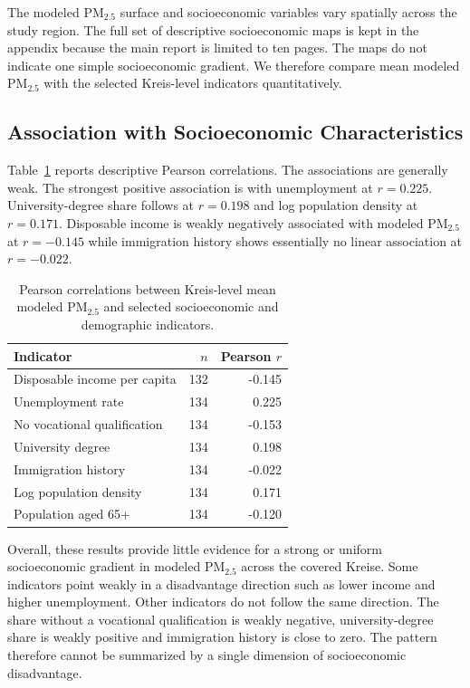 \documentclass[english, a4paper]{article}
\begin{document}
The modeled PM$_{2.5}$ surface and socioeconomic variables vary spatially across the study region. The full set of descriptive socioeconomic maps is kept in the appendix because the main report is limited to ten pages. The maps do not indicate one simple socioeconomic gradient. We therefore compare mean modeled PM$_{2.5}$ with the selected Kreis-level indicators quantitatively.


\subsection{Association with Socioeconomic Characteristics}
\label{sec:socio_assoc}

Table~\ref{tab:socio_correlations} reports descriptive Pearson correlations. The associations are generally weak. The strongest positive association is with unemployment at $r=0.225$. University-degree share follows at $r=0.198$ and log population density at $r=0.171$. Disposable income is weakly negatively associated with modeled PM$_{2.5}$ at $r=-0.145$ while immigration history shows essentially no linear association at $r=-0.022$.

\begin{table}[ht]
\centering
\caption{Pearson correlations between Kreis-level mean modeled PM$_{2.5}$ and selected socioeconomic and demographic indicators.}
\label{tab:socio_correlations}
\begin{tabular}{lrr}
\toprule
Indicator & $n$ & Pearson $r$ \\
\midrule
Disposable income per capita & 132 & -0.145 \\
Unemployment rate & 134 & 0.225 \\
No vocational qualification & 134 & -0.153 \\
University degree & 134 & 0.198 \\
Immigration history & 134 & -0.022 \\
Log population density & 134 & 0.171 \\
Population aged 65+ & 134 & -0.120 \\
\bottomrule
\end{tabular}
\end{table}

Overall, these results provide little evidence for a strong or uniform socioeconomic gradient in modeled PM$_{2.5}$ across the covered Kreise. Some indicators point weakly in a disadvantage direction such as lower income and higher unemployment. Other indicators do not follow the same direction. The share without a vocational qualification is weakly negative, university-degree share is weakly positive and immigration history is close to zero. The pattern therefore cannot be summarized by a single dimension of socioeconomic disadvantage.
\end{document}
